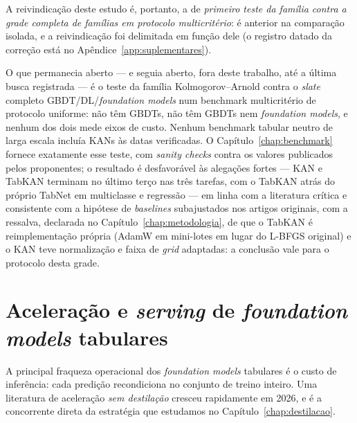 A reivindicação deste estudo é, portanto, a de \emph{primeiro teste
da família contra a grade completa de famílias em protocolo
multicritério}: \citet{poeta2024} é anterior na comparação isolada,
e a reivindicação foi delimitada em função dele (o registro datado da
correção está no Apêndice~\ref{app:suplementares}).

O que permanecia aberto --- e seguia aberto, fora deste trabalho, até
a última busca registrada --- é o teste da família Kolmogorov--Arnold
contra o \emph{slate} completo GBDT/DL/\emph{foundation models} num
benchmark multicritério de protocolo uniforme: \citet{poeta2024} não têm
GBDTs, \citet{kancritical2024} não têm GBDTs nem \emph{foundation models},
e nenhum dos dois mede eixos de custo. Nenhum benchmark tabular neutro de
larga escala incluía KANs às datas verificadas. O
Capítulo~\ref{chap:benchmark} fornece exatamente esse teste, com
\emph{sanity checks} contra os valores publicados pelos proponentes; o
resultado é desfavorável às alegações fortes --- KAN e TabKAN terminam no
último terço nas três tarefas, com o TabKAN atrás do próprio TabNet em
multiclasse e regressão --- em linha com a literatura crítica e
consistente com a hipótese de \emph{baselines} subajustados nos artigos
originais, com a ressalva, declarada no
Capítulo~\ref{chap:metodologia}, de que o TabKAN é reimplementação
própria (AdamW em mini-lotes em lugar do L-BFGS original) e o KAN teve
normalização e faixa de \emph{grid} adaptadas: a conclusão vale
para o protocolo desta grade.

\section{Aceleração e \emph{serving} de \emph{foundation models} tabulares}
\label{sec:rel-serving}

A principal fraqueza operacional dos \emph{foundation models} tabulares é o
custo de inferência: cada predição recondiciona no conjunto de treino
inteiro. Uma literatura de aceleração \emph{sem destilação} cresceu
rapidamente em 2026, e é a concorrente direta da estratégia que estudamos
no Capítulo~\ref{chap:destilacao}.

